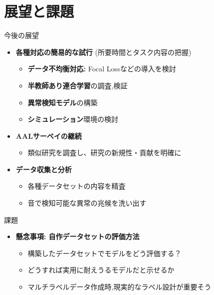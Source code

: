\documentclass[unicode,12pt,aspectratio=169,dvipdfmx]{beamer}
\begin{document}
\section{展望と課題}
\begin{frame}{今後の展望}
    \begin{itemize}
        \item \textbf{各種対応の簡易的な試行} (所要時間とタスク内容の把握)
        \begin{itemize}
            \item \textbf{データ不均衡対応:} Focal Lossなどの導入を検討
            \item \textbf{半教師あり連合学習}の調査,検証
            \item \textbf{異常検知モデル}の構築
            \item \textbf{シミュレーション}環境の検討
        \end{itemize}
        \item \textbf{AALサーベイの継続}
        \begin{itemize}
            \item 類似研究を調査し、研究の新規性・貢献を明確に
        \end{itemize}
        \item \textbf{データ収集と分析}
        \begin{itemize}
            \item 各種データセットの内容を精査
            \item 音で検知可能な異常の兆候を洗い出す
        \end{itemize}
    \end{itemize}
\end{frame}

\begin{frame}{課題}
    \begin{itemize}
        \item \textbf{懸念事項: 自作データセットの評価方法}
        \begin{itemize}
            \item 構築したデータセットでモデルをどう評価する？
            \item どうすれば実用に耐えうるモデルだと示せるか
            \item マルチラベルデータ作成時,現実的なラベル設計が重要そう
        \end{itemize}
    \end{itemize}
\end{frame}
\end{document}
